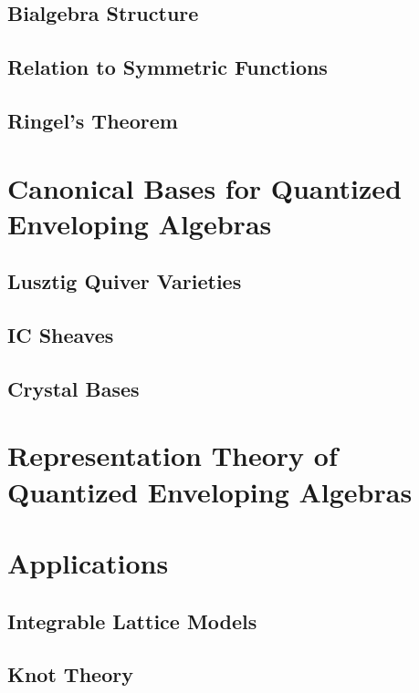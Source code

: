 \documentclass{book}
\begin{document}
  \section{Bialgebra Structure}

  \section{Relation to Symmetric Functions}

  \section{Ringel's Theorem}


\chapter{Canonical Bases for Quantized Enveloping Algebras}

  \section{Lusztig Quiver Varieties}

  \section{IC Sheaves}

  \section{Crystal Bases}


\chapter{Representation Theory of Quantized Enveloping Algebras}


\chapter{Applications}

  \section{Integrable Lattice Models}

  \section{Knot Theory}
\end{document}
